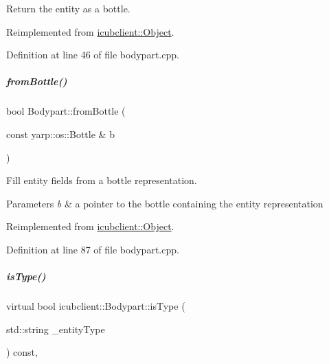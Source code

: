 Return the entity as a bottle. 



Reimplemented from \hyperlink{group__icubclient__representations_a60acd95fa583dc758f2b76e1968a7ea2}{icubclient\+::\+Object}.



Definition at line 46 of file bodypart.\+cpp.

\mbox{\label{group__icubclient__representations_a0d70a33efc69486a46e7f6a06abc5ff2}} 
\subparagraph{\texorpdfstring{from\+Bottle()}{fromBottle()}}
{\footnotesize\ttfamily bool Bodypart\+::from\+Bottle (\begin{DoxyParamCaption}\item[{const yarp\+::os\+::\+Bottle \&}]{b }\end{DoxyParamCaption})\hspace{0.3cm}{\ttfamily [virtual]}}



Fill entity fields from a bottle representation. 


\begin{DoxyParams}{Parameters}
{\em b} & a pointer to the bottle containing the entity representation \\
\hline
\end{DoxyParams}


Reimplemented from \hyperlink{group__icubclient__representations_ab5662af99b6bfa7d3996192c62536bf1}{icubclient\+::\+Object}.



Definition at line 87 of file bodypart.\+cpp.

\mbox{\label{group__icubclient__representations_a092e89cbeecc23d729be0423216a9920}} 
\subparagraph{\texorpdfstring{is\+Type()}{isType()}}
{\footnotesize\ttfamily virtual bool icubclient\+::\+Bodypart\+::is\+Type (\begin{DoxyParamCaption}\item[{std\+::string}]{\+\_\+entity\+Type }\end{DoxyParamCaption}) const\hspace{0.3cm}{\ttfamily [inline]}, {\ttfamily [virtual]}}



